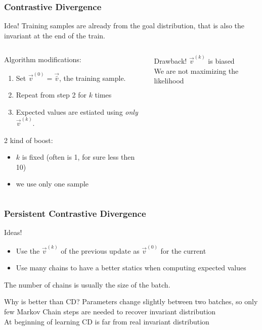 \begin{frame}
  \frametitle{Contrastive Divergence}
  \begin{alertblock}{Idea!}
    Training samples are already from the goal distribution, that is also the invariant at the end of the train.\\
  \end{alertblock}
  \vspace{20pt}
  \begin{columns}
    \begin{column}{0.66\textwidth}
      Algorithm modifications:
      \begin{enumerate}
        \item Set \(\vec{v}^{(0)} = \vec{\bar{v}}\), the training  sample.
        \addtocounter{enumi}{2}
        \item Repeat from step 2 for \alert{\(k\) times}
        \item Expected values are estiated using \emph{only} \(\vec{v}^{(k)}\).
      \end{enumerate}
      2 kind  of boost:
      \begin{itemize}
        \item \(k\) is fixed (often is 1, for  sure less  then 10)
        \item we use only one sample
      \end{itemize}
    \end{column}
    \begin{column}{0.32\textwidth}
      \begin{alertblock}{Drawback!}
        \(\vec{v}^{(k)}\) is biased\\
        We are not maximizing the likelihood
      \end{alertblock}
    \end{column}
  \end{columns}
\end{frame}

\begin{frame}
  \frametitle{Persistent Contrastive Divergence}
  \begin{alertblock}{Ideas!}
    \begin{itemize}
      \item Use the \(\vec{v}^{(k)}\) of the previous update as \(\vec{v}^{(0)}\) for the current
      \item Use many chains to have a better statics  when computing expected values
    \end{itemize}
  \end{alertblock}
  The number of chains is usually the size of the batch.
  \begin{alertblock}{Why is better than CD?}
     Parameters change slightly between two batches, so only few Markov Chain steps are needed to recover invariant distribution \\
     At beginning of learning CD is far from real invariant distribution 
  \end{alertblock}
\end{frame}

